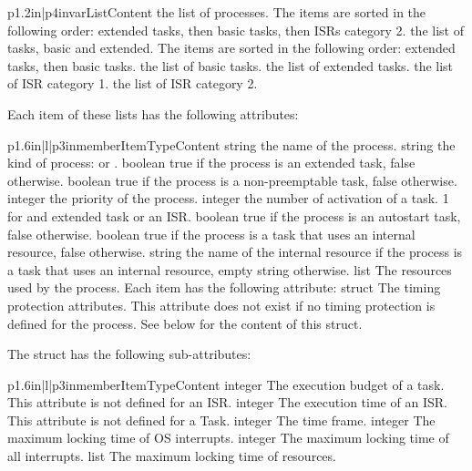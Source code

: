 \begin{longtableii}{p{1.2in}|p{4in}}{var}{List}{Content}
  {the list of processes. The items are sorted in the following order: extended tasks, then basic tasks, then ISRs category 2.}
  {the list of tasks, basic and extended. The items are sorted in the following order: extended tasks, then basic tasks.}
  {the list of basic tasks.}
  {the list of extended tasks.}
  {the list of ISR category 1.}
  {the list of ISR category 2.}
\end{longtableii}

Each item of these lists has the following attributes:

\begin{longtableiii}{p{1.6in}|l|p{3in}}{member}{Item}{Type}{Content}
  {string}
  {the name of the process.}
  {string}
  {the kind of process:  or .}
  {boolean}
  {true if the process is an extended task, false otherwise.}
  {boolean}
  {true if the process is a non-preemptable task, false otherwise.}
  {integer}
  {the priority of the process.}
  {integer}
  {the number of activation of a task. 1 for and extended task or an ISR.}
  {boolean}
  {true if the process is an autostart task, false otherwise.}
  {boolean}
  {true if the process is a task that uses an internal resource, false otherwise.}
  {string}
  {the name of the internal resource if the process is a task that uses an internal resource, empty string otherwise.}
  {list}
  {The resources used by the process. Each item has the following attribute: }
  {struct}
  {The timing protection attributes. This attribute does not exist if no timing protection is defined for the process. See below for the content of this struct.}
\end{longtableiii}

The  struct has the following sub-attributes:

\begin{longtableiii}{p{1.6in}|l|p{3in}}{member}{Item}{Type}{Content}
  {integer}
  {The execution budget of a task. This attribute is not defined for an ISR.}
  {integer}
  {The execution time of an ISR. This attribute is not defined for a Task.}
  {integer}
  {The time frame.}
  {integer}
  {The maximum locking time of OS interrupts.}
  {integer}
  {The maximum locking time of all interrupts.}
  {list}
  {The maximum locking time of resources.}
\end{longtableiii}

